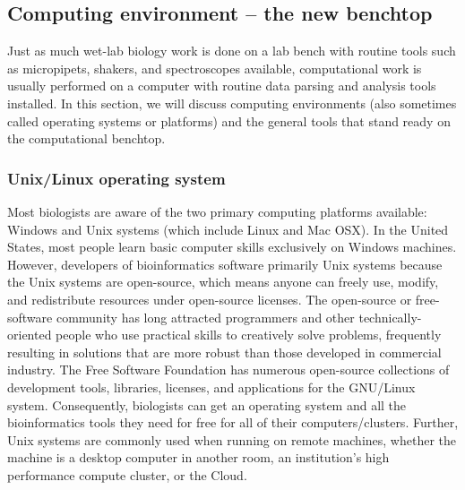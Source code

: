 \documentclass[ChapterTOCs,krantz2]{krantz} %
\begin{document}
\subsection{Computing environment -- the new benchtop}

Just as much wet-lab biology work is done on a lab bench with routine tools
such as micropipets, shakers, and spectroscopes available, computational work
is usually performed on a computer with routine data parsing and analysis tools
installed.  In this section, we will discuss computing environments (also
sometimes called operating systems or platforms) and the general tools that
stand ready on the computational benchtop.  

\subsubsection{Unix/Linux operating system}

Most biologists are aware of the two primary computing platforms available:
Windows and Unix systems (which include Linux and Mac OSX). 
In the United States, most people
learn basic computer skills exclusively on Windows machines.  
However, developers of bioinformatics
software primarily Unix systems because the Unix
systems are open-source, which means anyone can freely use, modify, and
redistribute resources under open-source licenses.  The open-source or 
free-software community has long attracted programmers and other 
technically-oriented people who use practical skills  
to creatively solve problems, frequently resulting in solutions that 
are more robust than  
those developed in commercial industry.    
The Free Software Foundation\cite{FSF} has numerous 
open-source collections of development
tools, libraries, licenses, and applications for the GNU/Linux system.
Consequently, biologists can get an operating system and all the bioinformatics
tools they need for free for all of their computers/clusters.  
Further, Unix systems are commonly used when 
running on remote machines, whether the machine is a desktop computer 
in another room, an institution's high performance compute cluster, or 
the Cloud.
\end{document}
